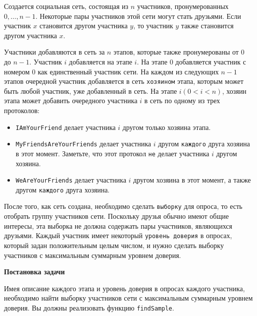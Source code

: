 Создается социальная сеть, состоящая из $n$ участников, пронумерованных $0, \ldots, n - 1$. Некоторые пары участников этой сети могут стать друзьями. Если участник $x$ становится другом участника $y$, то участник $y$ также становится другом участника $x$.

Участники добавляются в сеть за $n$ этапов, которые также пронумерованы от $0$ до $n - 1$. Участник $i$ добавляется на этапе $i$. На этапе $0$ добавляется участник с номером $0$ как единственный участник сети. На каждом из следующих $n - 1$ этапов очередной участник добавляется в сеть \texttt{хозяином} этапа, которым может быть любой участник, уже добавленный в сеть. На этапе $i (0 < i < n)$, хозяин этапа может добавить очередного участника $i$ в сеть по одному из трех протоколов:

\begin{itemize}
\item \texttt{IAmYourFriend} делает участника $i$ другом только хозяина этапа.
\item \texttt{MyFriendsAreYourFriends} делает участника $i$ другом \texttt{каждого} друга хозяина в этот момент. Заметьте, что этот протокол \texttt{не} делает участника $i$ другом хозяина.
\item \texttt{WeAreYourFriends} делает участника $i$ другом хозяина в этот момент, а также другом \texttt{каждого} друга хозяина.
\end{itemize}

После того, как сеть создана, необходимо сделать \texttt{выборку} для опроса, то есть отобрать группу участников сети. Поскольку друзья обычно имеют общие интересы, эта выборка не должна содержать пары участников, являющихся друзьями. Каждый участник имеет
некоторый \texttt{уровень доверия} в опросах, который задан положительным целым числом, и нужно сделать выборку участников с максимальным суммарным уровнем доверия.

\textbf{Постановка задачи}

Имея описание каждого этапа и уровень доверия в опросах каждого участника, необходимо
найти выборку участников сети с максимальным суммарным уровнем доверия. Вы должны
реализовать функцию \texttt{findSample}.

